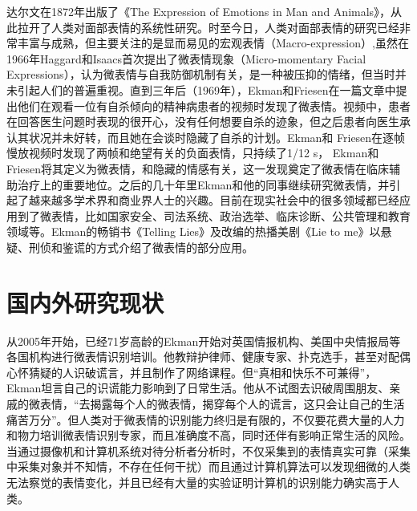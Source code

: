达尔文在1872年出版了《The Expression of Emotions in Man and Animals》，从此拉开了人类对面部表情的系统性研究。时至今日，人类对面部表情的研究已经非常丰富与成熟，但主要关注的是显而易见的宏观表情（Macro-expression）,虽然在1966年Haggard和Isaacs首次提出了微表情现象（Micro-momentary Facial Expressions），认为微表情与自我防御机制有关，是一种被压抑的情绪，但当时并未引起人们的普遍重视。直到三年后（1969年），Ekman和Friesen在一篇文章中提出他们在观看一位有自杀倾向的精神病患者的视频时发现了微表情。视频中，患者在回答医生问题时表现的很开心，没有任何想要自杀的迹象，但之后患者向医生承认其状况并未好转，而且她在会谈时隐藏了自杀的计划。Ekman和 Friesen在逐帧慢放视频时发现了两帧和绝望有关的负面表情，只持续了1/12 s， Ekman和 Friesen将其定义为微表情，和隐藏的情感有关，这一发现奠定了微表情在临床辅助治疗上的重要地位。之后的几十年里Ekman和他的同事继续研究微表情，并引起了越来越多学术界和商业界人士的兴趣。目前在现实社会中的很多领域都已经应用到了微表情，比如国家安全、司法系统、政治选举、临床诊断、公共管理和教育领域等。Ekman的畅销书《Telling Lies》及改编的热播美剧《Lie to me》以悬疑、刑侦和鉴谎的方式介绍了微表情的部分应用。

\section{国内外研究现状}\label{sec:system}

从2005年开始，已经71岁高龄的Ekman开始对英国情报机构、美国中央情报局等各国机构进行微表情识别培训。他教辩护律师、健康专家、扑克选手，甚至对配偶心怀猜疑的人识破谎言，并且制作了网络课程。但“真相和快乐不可兼得”，Ekman坦言自己的识谎能力影响到了日常生活。他从不试图去识破周围朋友、亲戚的微表情，“去揭露每个人的微表情，揭穿每个人的谎言，这只会让自己的生活痛苦万分”。但人类对于微表情的识别能力终归是有限的，不仅要花费大量的人力和物力培训微表情识别专家，而且准确度不高，同时还伴有影响正常生活的风险。当通过摄像机和计算机系统对待分析者分析时，不仅采集到的表情真实可靠（采集中采集对象并不知情，不存在任何干扰）而且通过计算机算法可以发现细微的人类无法察觉的表情变化，并且已经有大量的实验证明计算机的识别能力确实高于人类。

